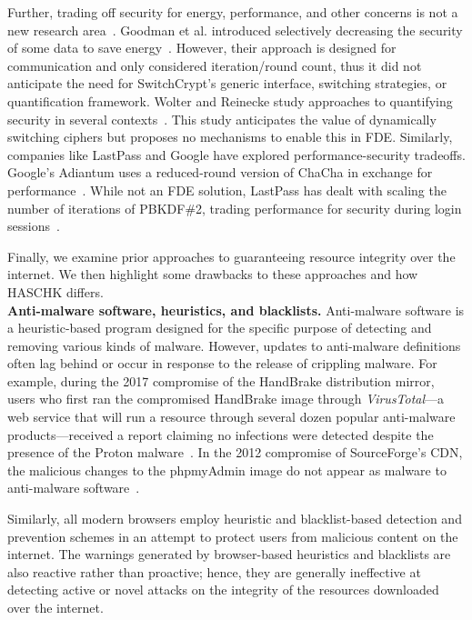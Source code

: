 Further, trading off security for energy, performance, and other concerns is not
a new research area~\cite{ScalableSecurity, WolterReinecke, ZengChow1,
HaleemEtAl, LiOmiecinski, Merkel4, Merkle3}. Goodman et al. introduced
selectively decreasing the security of some data to save
energy~\cite{ScalableSecurity}. However, their approach is designed for
communication and only considered iteration/round count, thus it did not
anticipate the need for SwitchCrypt's generic interface, switching strategies,
or quantification framework. Wolter and Reinecke study approaches to quantifying
security in several contexts~\cite{WolterReinecke}. This study anticipates the
value of dynamically switching ciphers but proposes no mechanisms to enable this
in FDE. Similarly, companies like LastPass and Google have explored
performance-security tradeoffs. Google's Adiantum uses a reduced-round version
of ChaCha in exchange for performance~\cite{Adiantum}. While not an FDE
solution, LastPass has dealt with scaling the number of iterations of PBKDF\#2,
trading performance for security during login sessions~\cite{LastPass}.

Finally, we examine prior approaches to guaranteeing resource integrity
over the internet. We then highlight some drawbacks to these approaches and how
HASCHK differs. \\

\noindent\textbf{Anti-malware software, heuristics, and blacklists.}
Anti-malware software is a heuristic-based program designed for the specific
purpose of detecting and removing various kinds of malware. However, updates to
anti-malware definitions often lag behind or occur in response to the release of
crippling malware. For example, during the 2017 compromise of the HandBrake
distribution mirror, users who first ran the compromised HandBrake image through
\textit{VirusTotal}---a web service that will run a resource through several
dozen popular anti-malware products---received a report claiming no infections
were detected despite the presence of the Proton malware~\cite{SCA-HB1}. In the
2012 compromise of SourceForge's CDN, the malicious changes to the phpmyAdmin
image do not appear as malware to anti-malware software~\cite{SCA-PMA1}.

Similarly, all modern browsers employ heuristic and blacklist-based detection
and prevention schemes in an attempt to protect users from malicious content on
the internet. The warnings generated by browser-based heuristics and blacklists
are also reactive rather than proactive; hence, they are generally ineffective
at detecting active or novel attacks on the integrity of the resources
downloaded over the internet.

